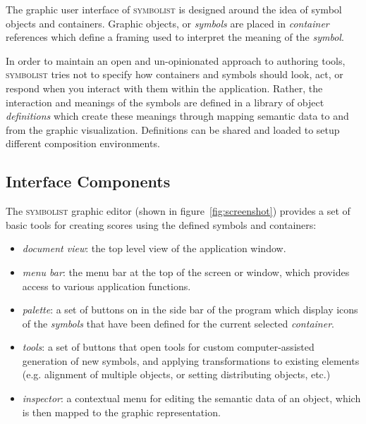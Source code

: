 \documentclass{article}
\def\symbolist{\textsc{symbolist}\xspace}
\begin{document}

The graphic user interface of \symbolist is designed around the idea of symbol objects and containers. Graphic objects, or \textit{symbols} are placed in \textit{container} references which define a framing used to interpret the meaning of the \textit{symbol}.

In order to maintain an open and un-opinionated approach to authoring tools, \symbolist tries not to specify how containers and symbols should look, act, or respond when you interact with them within the application. Rather, the interaction and meanings of the symbols are defined in a library of object \textit{definitions} which create these meanings through mapping semantic data to and from the graphic visualization. Definitions can be shared and loaded to setup different composition environments.


\subsection{Interface Components}\label{subsec:interface_components}


The \symbolist graphic editor (shown in figure~\ref{fig:screenshot}) provides a set of basic tools for creating scores using the defined symbols and containers:
\begin{itemize}\itemsep0pt 
\item \textit{document view}: the top level view of the application window.
\item \textit{menu bar}: the menu bar at the top of the screen or window, which provides access to various application functions.
\item \textit{palette}: a set of buttons on in the side bar of the program which display icons of the \textit{symbols} that have been defined for the current selected \textit{container}. 
\item \textit{tools}: a set of buttons that open tools for custom computer-assisted generation of new symbols, and applying transformations to existing elements (e.g. alignment of multiple objects, or setting distributing objects, etc.)
\item \textit{inspector}: a contextual menu for editing the semantic data of an object, which is then mapped to the graphic representation.
\end{itemize}
\end{document}
